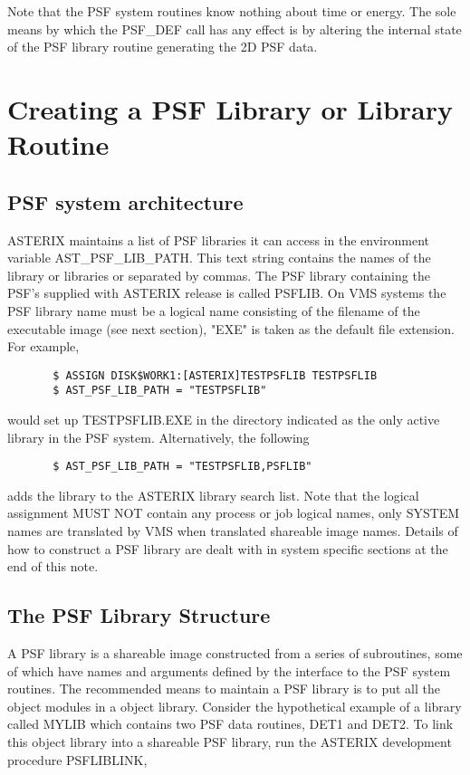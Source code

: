      Note that the PSF system routines know nothing about time or 
     energy. The sole means by which the PSF\_DEF call has any effect
     is by altering the internal state of the PSF library routine
     generating the 2D PSF data.

\section{Creating a PSF Library or Library Routine}

\subsection{PSF system architecture}

     ASTERIX maintains a list of PSF libraries it can access in the
     environment variable AST\_PSF\_LIB\_PATH. This text string contains
     the names of the library or libraries or separated by commas. The
     PSF library containing the PSF's supplied with ASTERIX release is
     called PSFLIB. On VMS systems the PSF library name must be a
     logical name consisting of the filename of the executable image
     (see next section), "EXE" is taken as the default file extension.
     For example,

\begin{verbatim}
       $ ASSIGN DISK$WORK1:[ASTERIX]TESTPSFLIB TESTPSFLIB
       $ AST_PSF_LIB_PATH = "TESTPSFLIB"
\end{verbatim}
     
     would set up TESTPSFLIB.EXE in the directory indicated as the only
     active library in the PSF system. Alternatively, the following

\begin{verbatim}
       $ AST_PSF_LIB_PATH = "TESTPSFLIB,PSFLIB"
\end{verbatim}
 
     adds the library to the ASTERIX library search list. Note that  
     the logical assignment MUST NOT contain any process or job logical 
     names, only SYSTEM names are translated by VMS when translated 
     shareable image names. Details of how to construct a PSF library 
     are dealt with in system specific sections at the end of this note.

\subsection{The PSF Library Structure}

     A PSF library is a shareable image constructed from a series of 
     subroutines, some of which have names and arguments defined by 
     the interface to the PSF system routines. The recommended means
     to maintain a PSF library is to put all the object modules in a
     object library. Consider the hypothetical example of a library 
     called MYLIB which contains two PSF data routines, DET1 and DET2.
     To link this object library into a shareable PSF library, run 
     the ASTERIX development procedure PSFLIBLINK,

